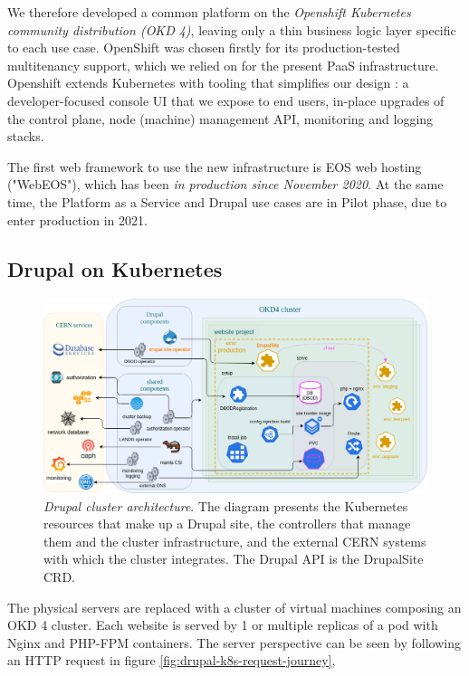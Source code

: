 We therefore developed a common platform on the \emph{Openshift Kubernetes community distribution (OKD 4)},
leaving only a thin business logic layer specific to each use case.
OpenShift was chosen firstly for its production-tested multitenancy support, which we relied on for the present PaaS infrastructure.
Openshift extends Kubernetes with tooling that simplifies our design \cite{jarvinen_extending_2019}:
a developer-focused console UI that we expose to end users, in-place upgrades of the control plane, node (machine) management API, monitoring and logging stacks.

The first web framework to use the new infrastructure is EOS web hosting ("WebEOS"), which has been \emph{in production since November 2020}.
At the same time, the Platform as a Service and Drupal use cases are in Pilot phase, due to enter production in 2021.

\subsection{Drupal on Kubernetes}

\begin{figure}
    \centering
    \includegraphics[width=.66\textwidth]{figures/drupal-architecture}
    \caption{\emph{Drupal cluster architecture}.
    The diagram presents the Kubernetes resources that {\color{darkseagreen} make up a Drupal site},
    the {\color{carolinablue} controllers} that manage them and the cluster infrastructure,
    and the {\color{beige} external CERN systems} with which the cluster integrates.
    The Drupal API is the {\color{fluorescentorange} DrupalSite CRD}.}
    \label{fig:drupal-architecture}
\end{figure}

The physical servers are replaced with a cluster of virtual machines composing an OKD 4 cluster.
Each website is served by 1 or multiple replicas of a pod with Nginx and PHP-FPM containers.
The server perspective can be seen by following an HTTP request in figure \ref{fig:drupal-k8s-request-journey},

